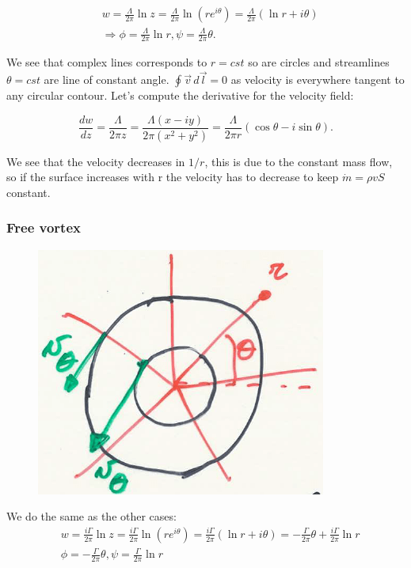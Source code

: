  		\begin{equation}
 		\begin{aligned}
 		&w = \frac{\Lambda}{2\pi} \ln z = \frac{\Lambda}{2\pi} \ln (r e^{i\theta}) = \frac{\Lambda}{2\pi} (\ln r + i\theta) \\
 		&\Rightarrow \phi = \frac{\Lambda}{2\pi} \ln r, \psi =  \frac{\Lambda}{2\pi}\theta.
 		\end{aligned}
 		\end{equation}
 		
 		We see that complex lines corresponds to $r =cst$ so are circles and streamlines $\theta = cst$ are line of constant angle. $\oint \vec{v}\, d\vec{l}=0$ as velocity is everywhere tangent to any circular contour. Let's compute the derivative for the velocity field:
 		
 		\begin{equation}
 		\frac{dw}{dz} = \frac{\Lambda}{2\pi z} = \frac{\Lambda (x-iy)}{2\pi (x^2+y^2)} = \frac{\Lambda}{2\pi r} (\cos \theta - i \sin \theta).
 		\end{equation}
 		
 		We see that the velocity decreases in $1/r$, this is due to the constant mass flow, so if the surface increases with r the velocity has to decrease to keep $\dot{m} = \rho v S$ constant. 
 		
 	\subsubsection{Free vortex}
 		\begin{figure}
		\vspace{-5mm}
		\includegraphics[scale=0.23]{ch2/26}
		\end{figure}
		We do the same as the other cases: 
 		\begin{equation}
 		\begin{aligned}
 		&w = \frac{i\Gamma}{2\pi} \ln z = \frac{i\Gamma}{2\pi} \ln (re^{i\theta}) = \frac{i\Gamma}{2\pi} (\ln r + i\theta) = -\frac{\Gamma}{2\pi} \theta + \frac{i\Gamma}{2\pi} \ln r \\
 		&\phi = -\frac{\Gamma}{2\pi} \theta, \psi = \frac{\Gamma}{2\pi} \ln r
 		\end{aligned}
 		\end{equation}
 		
